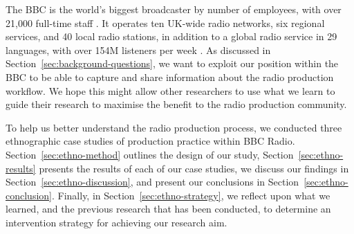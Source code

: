 The BBC is the world's biggest broadcaster by number of employees, with over 21,000 full-time staff
\citep[p.~56]{BBC2017a}. It operates ten UK-wide radio networks, six regional services, and 40 local radio stations, in
addition to a global radio service in 29 languages, with over 154M listeners per week \citep[pp.~4, 32]{BBC2017a}.  As
discussed in Section~\ref{sec:background-questions}, we want to exploit our position within the BBC to be able to
capture and share information about the radio production workflow. We hope this might allow other researchers to use
what we learn to guide their research to maximise the benefit to the radio production community.



To help us better understand the radio production process, we conducted three ethnographic case studies of production
practice within BBC Radio.  Section~\ref{sec:ethno-method} outlines the design of our study,
Section~\ref{sec:ethno-results} presents the results of each of our case studies, we discuss our findings in
Section~\ref{sec:ethno-discussion}, and present our conclusions in Section~\ref{sec:ethno-conclusion}.  Finally, in
Section~\ref{sec:ethno-strategy}, we reflect upon what we learned, and the previous research that has been conducted,
to determine an intervention strategy for achieving our research aim.



